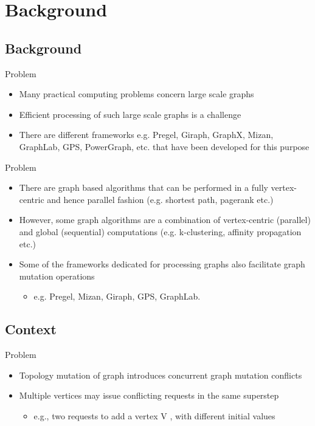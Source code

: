 \section{Background}
\subsection{Background}
\begin{frame}{Problem}
  \begin{itemize}
    \item Many practical computing problems concern large scale graphs
    \item Efficient processing of such large scale graphs is a challenge
    \item  There are different frameworks e.g. Pregel, Giraph, GraphX, Mizan, GraphLab, GPS, PowerGraph, etc. that have been developed for this purpose
  \end{itemize}
  \end{frame}

  \begin{frame}{Problem}
    \begin{itemize}
    \item There are graph based algorithms that can be performed in a fully vertex-centric and hence parallel fashion (e.g. shortest path, pagerank etc.)
    \item However, some graph algorithms are a combination of vertex-centric (parallel) and global (sequential) computations (e.g. k-clustering, affinity propagation etc.)
    \item Some of the frameworks dedicated for processing graphs also facilitate graph mutation operations
        \begin{itemize}
          \item e.g. Pregel, Mizan, Giraph, GPS, GraphLab.
        \end{itemize}
      \end{itemize}
    \end{frame}

\subsection{Context}
    \begin{frame}{Problem}
    \begin{itemize}
    \item Topology mutation of graph introduces concurrent graph mutation conflicts
    \newline
     \item Multiple vertices may issue conflicting requests in the same superstep
     	\begin{itemize}
		\item e.g., two requests to add a vertex V , with different initial values
	\end{itemize}
 \end{itemize}
\end{frame}


